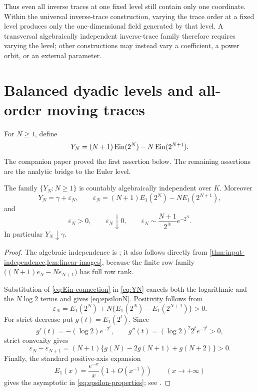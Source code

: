 Thus even all inverse traces at one fixed level still contain only one
coordinate.  Within the universal inverse-trace construction, varying the
trace order at a fixed level produces only the one-dimensional field
generated by that level.  A transversal algebraically independent
inverse-trace family therefore requires varying the level; other constructions
may instead vary a coefficient, a power orbit, or an external parameter.

\section{Balanced dyadic levels and all-order moving traces}
\label{sec:dyadic}

For \(N\ge1\), define
\begin{equation}\label{eq:YN}
 Y_N=(N+1)\operatorname{Ein}(2^N)-N\operatorname{Ein}(2^{N+1}).
\end{equation}
The companion paper proved the first assertion below.  The remaining
assertions are the analytic bridge to the Euler level.

\begin{proposition}
\label{prop:dyadic-approach}
The family \(\{Y_N:N\ge1\}\) is countably algebraically independent over
\(K\).  Moreover
\begin{equation}\label{eq:epsilonN}
 Y_N=\gamma+\varepsilon_N,
 \qquad
 \varepsilon_N=(N+1)E_1(2^N)-NE_1(2^{N+1}),
\end{equation}
and
\begin{equation}\label{eq:epsilon-properties}
 \varepsilon_N>0,\qquad
 \varepsilon_N\downarrow0,\qquad
 \varepsilon_N\sim\frac{N+1}{2^N}e^{-2^N}.
\end{equation}
In particular \(Y_N\downarrow\gamma\).
\end{proposition}

\begin{proof}
The algebraic independence is \cite[Lem.~11.2]{KEIO2026I}; it also follows directly from
\cref{thm:input-independence,lem:linear-images}, because the finite row family
\(\bigl((N+1)e_N-Ne_{N+1}\bigr)\) has full row rank.

Substitution of \eqref{eq:Ein-connection} in \eqref{eq:YN} cancels both the
logarithmic and the \(N\log2\) terms and gives \eqref{eq:epsilonN}.  Positivity
follows from
\[
 \varepsilon_N
 =E_1(2^N)+N\{E_1(2^N)-E_1(2^{N+1})\}>0.
\]
For strict decrease put \(g(t)=E_1(2^t)\).  Since
\[
 g'(t)=-(\log2)e^{-2^t},\qquad
 g''(t)=(\log2)^2 2^t e^{-2^t}>0,
\]
strict convexity gives
\[
 \varepsilon_N-\varepsilon_{N+1}
 =(N+1)\{g(N)-2g(N+1)+g(N+2)\}>0.
\]
Finally, the standard positive-axis expansion
\begin{equation}\label{eq:E1-asymptotic}
 E_1(x)=\frac{e^{-x}}x\left(1+O(x^{-1})\right)
 \qquad(x\to+\infty)
\end{equation}
gives the asymptotic in \eqref{eq:epsilon-properties}; see
\cite[\S6.12\(i\)]{DLMF}.
\end{proof}

